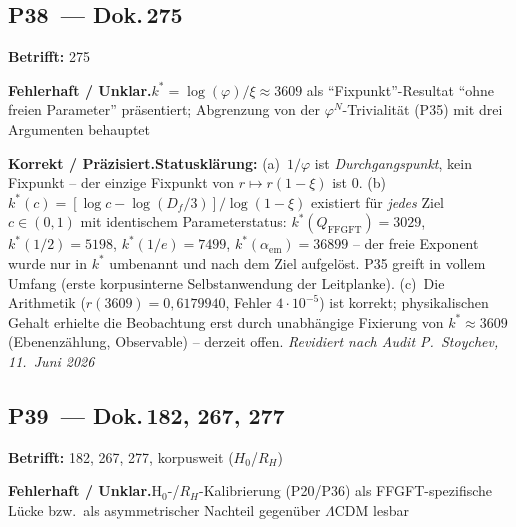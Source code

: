 \medskip


\subsection*{P38~--- Dok.\,275}

\noindent\textbf{Betrifft:} 275


\smallskip\noindent\textbf{Fehlerhaft / Unklar.}\quad $k^* = \log(\varphi)/\xi \approx 3609$ als \enquote{Fixpunkt}-Resultat
  \enquote{ohne freien Parameter} präsentiert; Abgrenzung von der
  $\varphi^N$-Trivialität (P35) mit drei Argumenten behauptet


\smallskip\noindent\textbf{Korrekt / Präzisiert.}\quad \textbf{Statusklärung:} (a)~$1/\varphi$ ist \emph{Durchgangspunkt},
  kein Fixpunkt -- der einzige Fixpunkt von $r\mapsto r(1-\xi)$ ist $0$.
  (b)~$k^*(c) = [\log c - \log(D_f/3)]/\log(1-\xi)$ existiert für
  \emph{jedes} Ziel $c\in(0,1)$ mit identischem Parameterstatus:
  $k^*(Q_\mathrm{FFGFT})=3029$, $k^*(1/2)=5198$, $k^*(1/e)=7499$,
  $k^*(\alpha_\mathrm{em})=36899$ -- der freie Exponent wurde nur in
  $k^*$ umbenannt und nach dem Ziel aufgelöst. P35 greift in vollem
  Umfang (erste korpusinterne Selbstanwendung der Leitplanke).
  (c)~Die Arithmetik ($r(3609)=0{,}6179940$, Fehler $4{\cdot}10^{-5}$)
  ist korrekt; physikalischen Gehalt erhielte die Beobachtung erst
  durch unabhängige Fixierung von $k^*\approx3609$ (Ebenenzählung,
  Observable) -- derzeit offen.
  \emph{Revidiert nach Audit P.~Stoychev, 11.~Juni 2026}


\medskip


\subsection*{P39~--- Dok.\,182, 267, 277}

\noindent\textbf{Betrifft:} 182, 267, 277, korpusweit ($H_0$/$R_H$)


\smallskip\noindent\textbf{Fehlerhaft / Unklar.}\quad H$_0$-/$R_H$-Kalibrierung (P20/P36) als FFGFT-spezifische Lücke bzw.\ als asymmetrischer Nachteil gegenüber $\Lambda$CDM lesbar


